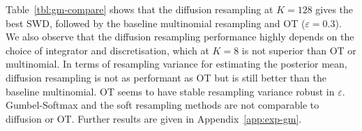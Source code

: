 \documentclass{article}
\begin{document}
\begin{table}[t!]
    \caption{Sliced 1-Wasserstein distance (SWD, scaled by $10^{-1}$) and resampling variance for the mean estimator (scaled by $10^{-2}$), for the Gaussian mixture resampling experiment in Section~\ref{sec:gm-importance-resampling}.}
    \label{tbl:gm-compare}
    \centering
\end{table}

Table~\ref{tbl:gm-compare} shows that the diffusion resampling at $K=128$ gives the best SWD, followed by the baseline multinomial resampling and OT ($\varepsilon=0.3$). 
We also observe that the diffusion resampling performance highly depends on the choice of integrator and discretisation, which at $K=8$ is not superior than OT or multinomial. 
In terms of resampling variance for estimating the posterior mean, diffusion resampling is not as performant as OT but is still better than the baseline multinomial. 
OT seems to have stable resampling variance robust in $\varepsilon$. 
Gumbel-Softmax and the soft resampling methods are not comparable to diffusion or OT.
Further results are given in Appendix~\ref{app:exp-gm}.
\end{document}
